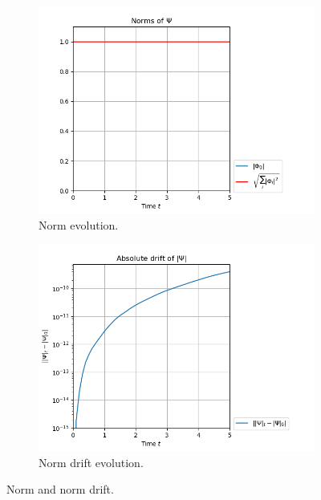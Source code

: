 \documentclass{article}
\begin{document}
\begin{figure}[H]
  \begin{subfigure}[b]{0.45 \textwidth}
    \includegraphics[width = \textwidth]{graphics/threefold_morse/norms_block0.PNG}
    \caption{Norm evolution.}
  \end{subfigure}
  \hfill
  \begin{subfigure}[b]{0.45 \textwidth}
    \includegraphics[width = \textwidth]{graphics/threefold_morse/norms_drift_block0_log.PNG}
    \caption{Norm drift evolution.}
  \end{subfigure}
  \caption{Norm and norm drift.}
  \label{fig:threefold_norm}
\end{figure}
\end{document}
